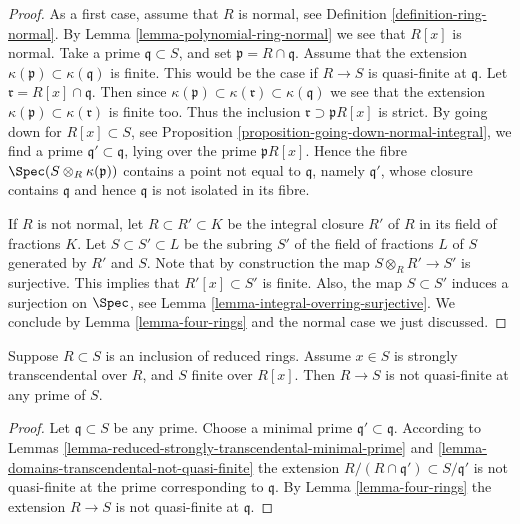 \begin{proof}
As a first case, assume that $R$ is normal, see
Definition \ref{definition-ring-normal}.
By Lemma \ref{lemma-polynomial-ring-normal}
we see that $R[x]$ is normal.
Take a prime $\mathfrak q \subset S$,
and set $\mathfrak p = R \cap \mathfrak q$.
Assume that the extension $\kappa(\mathfrak p)
\subset \kappa(\mathfrak q)$ is finite.
This would be the case if $R \to S$ is
quasi-finite at $\mathfrak q$.
Let $\mathfrak r = R[x] \cap \mathfrak q$.
Then since $\kappa(\mathfrak p)
\subset \kappa(\mathfrak r) \subset \kappa(\mathfrak q)$
we see that the extension $\kappa(\mathfrak p)
\subset \kappa(\mathfrak r)$ is finite too.
Thus the inclusion $\mathfrak r \supset \mathfrak p R[x]$
is strict. By going down for $R[x] \subset S$,
see Proposition \ref{proposition-going-down-normal-integral},
we find a prime $\mathfrak q' \subset \mathfrak q$,
lying over the prime $\mathfrak pR[x]$. Hence
the fibre $\Spec(S \otimes_R \kappa(\mathfrak p))$
contains a point not equal to $\mathfrak q$,
namely $\mathfrak q'$, whose closure contains $\mathfrak q$ and hence
$\mathfrak q$ is not isolated in its fibre.

\medskip\noindent
If $R$ is not normal, let $R \subset R' \subset K$ be
the integral closure $R'$ of $R$ in its field of fractions
$K$. Let $S \subset S' \subset L$ be the subring $S'$ of
the field of fractions $L$ of $S$ generated by $R'$ and
$S$. Note that by construction the map $S \otimes_R R'
\to S'$ is surjective. This implies that $R'[x] \subset S'$
is finite. Also, the map $S \subset S'$
induces a surjection on $\Spec$, see
Lemma \ref{lemma-integral-overring-surjective}.
We conclude by Lemma \ref{lemma-four-rings} and the normal case
we just discussed.
\end{proof}

\begin{lemma}
\label{lemma-reduced-strongly-transcendental-not-quasi-finite}
Suppose $R \subset S$ is an inclusion of reduced rings.
Assume $x \in S$ is strongly transcendental over $R$,
and $S$ finite over $R[x]$. Then $R \to S$ is not
quasi-finite at any prime of $S$.
\end{lemma}

\begin{proof}
Let $\mathfrak q \subset S$ be any prime.
Choose a minimal prime $\mathfrak q' \subset \mathfrak q$.
According to Lemmas
\ref{lemma-reduced-strongly-transcendental-minimal-prime} and
\ref{lemma-domains-transcendental-not-quasi-finite}
the extension $R/(R \cap \mathfrak q') \subset
S/\mathfrak q'$ is not quasi-finite at the prime corresponding
to $\mathfrak q$. By Lemma \ref{lemma-four-rings}
the extension $R \to S$ is not quasi-finite
at $\mathfrak q$.
\end{proof}
